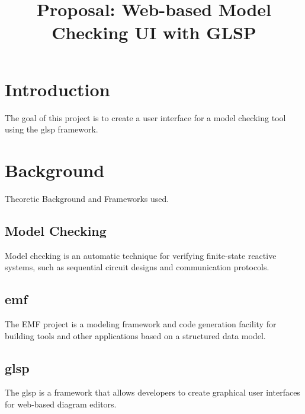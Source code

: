 \documentclass[conference,onecolumn]{IEEEtran}
\begin{document}
  \title{Proposal: Web-based Model Checking UI with GLSP}

  \author{
    }

  \maketitle

  \IEEEpeerreviewmaketitle

  \section{Introduction}
  \label{sec:introduction}
  The goal of this project is to create a user interface for a model checking tool using the \ac{glsp} framework. 

  \section{Background}
  \label{sec:background}
  Theoretic Background and Frameworks used.

  \subsection{Model Checking}
  \label{subsec:model-checking}
  Model checking is an automatic technique for verifying finite-state reactive systems, such as sequential circuit designs and communication protocols.
  \cite{modelchecking1} \cite{modelchecking2}

  \subsection{\ac{emf}}
  \label{subsec:emf}

  The EMF project is a modeling framework and code generation facility for building tools and other applications based on a structured data model.
  \cite{emf} \cite{emf-repo}

  \subsection{\ac{glsp}}
  \label{subsec:glsp}

  The \ac{glsp} is a framework that allows developers to create graphical user interfaces for web-based diagram editors.
  \cite{glsp-repo}
\end{document}
